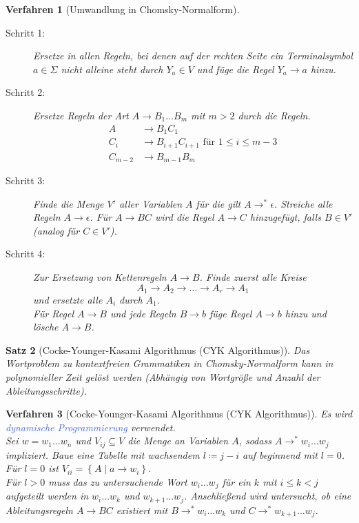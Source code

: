\documentclass[11pt]{scrartcl}
\newcommand{\tcol}[1]{\textcolor{RoyalBlue}{#1}}
\newcommand{\set}[1]{\left\lbrace #1\right\rbrace}
\theoremstyle{break}
\newtheorem{satz}{Satz}[section]
\newtheorem{verf}[satz]{Verfahren}
\begin{document}
    \begin{verf}[Umwandlung in Chomsky-Normalform]
        \begin{description}
            \item[Schritt 1:] Ersetze in allen Regeln, bei denen auf der rechten Seite ein Terminalsymbol $a\in\Sigma$ nicht alleine steht durch $Y_a\in V$ und füge die Regel $Y_a\rightarrow a$ hinzu.
            \item[Schritt 2:] Ersetze Regeln der Art $A\rightarrow B_1\dots B_m$ mit $m>2$ durch die Regeln.
            \begin{align*}
                A&\rightarrow B_{1}C_{1}\\
                C_i&\rightarrow B_{i+1}C_{i+1} \text{ für } 1\leq i\leq m-3\\
                C_{m-2}&\rightarrow B_{m-1}B_m
            \end{align*}
            \item[Schritt 3:] Finde die Menge $V'$ aller Variablen $A$ für die gilt $A\rightarrow^*\epsilon$.
            Streiche alle Regeln $A\rightarrow\epsilon$.
            Für $A\rightarrow BC$ wird die Regel $A\rightarrow C$ hinzugefügt, falls $B\in V'$ (analog für $C\in V'$).
            \item[Schritt 4:] Zur Ersetzung von Kettenregeln $A\rightarrow B$.
            Finde zuerst alle Kreise \[A_1\rightarrow A_2\rightarrow\dots\rightarrow A_r\rightarrow A_1\] und ersetzte alle $A_i$ durch $A_1$.\\
            Für Regel $A\rightarrow B$ und jede Regeln $B\rightarrow b$ füge Regel $A\rightarrow b$ hinzu und lösche $A\rightarrow B$.
        \end{description}
    \end{verf}

    \begin{satz}[Cocke-Younger-Kasami Algorithmus (CYK Algorithmus)]
        Das Wortproblem zu kontextfreien Grammatiken in Chomsky-Normalform kann in polynomieller Zeit gelöst werden (Abhängig von Wortgröße und Anzahl der Ableitungsschritte).
    \end{satz}

    \begin{verf}[Cocke-Younger-Kasami Algorithmus (CYK Algorithmus)]
        Es wird \tcol{dynamische Programmierung} verwendet.\\
        Sei $w=w_1\dots w_n$ und $V_{ij}\subseteq V$ die Menge an Variablen $A$, sodass $A\rightarrow^*w_i\dots w_j$ impliziert.
        Baue eine Tabelle mit wachsendem $l\coloneqq j-i$ auf beginnend mit $l=0$.\\
        Für $l=0$ ist $V_{ii}=\set{A\mid a\rightarrow w_i}$.\\
        Für $l>0$ muss das zu untersuchende Wort $w_i\dots w_j$ für ein $k$ mit $i\leq k<j$ aufgeteilt werden in $w_i\dots w_k$ und $w_{k+1}\dots w_j$.
        Anschließend wird untersucht, ob eine Ableitungsregeln $A\rightarrow BC$ existiert mit $B\rightarrow^* w_i\dots w_k$ und $C\rightarrow^* w_{k+1}\dots w_j$.
    \end{verf}
\end{document}
